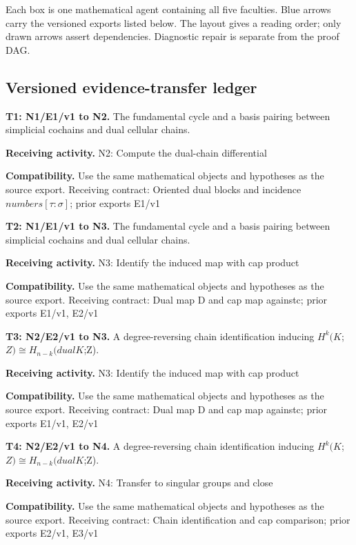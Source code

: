\documentclass[preprint,12pt,aps,pra,showkeys,amsmath,amssymb,superscriptaddress,floatfix]{revtex4-2}
\theoremstyle{definition}
\theoremstyle{remark}
\newcommand{\field}[2]{\par\smallskip\noindent\textbf{#1.} #2\par}
\begin{document}
Each box is one mathematical agent containing all five faculties. Blue
arrows carry the versioned exports listed below. The layout gives a
reading order; only drawn arrows assert dependencies. Diagnostic repair
is separate from the proof DAG.

\clearpage\subsection{Versioned evidence-transfer ledger}

\begingroup\small\linespread{1.05}\selectfont

\field{T1: N1/E1/v1 to N2}{The fundamental cycle and a basis pairing between simplicial cochains
and dual cellular chains.}

\field{Receiving activity}{N2: Compute the dual-chain differential}

\field{Compatibility}{Use the same mathematical objects and hypotheses as the source export.
Receiving contract: Oriented dual blocks and incidence
\(numbers[\tau :\sigma ]\); prior exports E1/v1}

\field{T2: N1/E1/v1 to N3}{The fundamental cycle and a basis pairing between simplicial cochains
and dual cellular chains.}

\field{Receiving activity}{N3: Identify the induced map with cap product}

\field{Compatibility}{Use the same mathematical objects and hypotheses as the source export.
Receiving contract: Dual map D and cap map againstc; prior exports
E1/v1, E2/v1}

\field{T3: N2/E2/v1 to N3}{A degree-reversing chain identification inducing
\(H^k(K\);\(Z)\cong H_{n-k}(dualK\);Z).}

\field{Receiving activity}{N3: Identify the induced map with cap product}

\field{Compatibility}{Use the same mathematical objects and hypotheses as the source export.
Receiving contract: Dual map D and cap map againstc; prior exports
E1/v1, E2/v1}

\field{T4: N2/E2/v1 to N4}{A degree-reversing chain identification inducing
\(H^k(K\);\(Z)\cong H_{n-k}(dualK\);Z).}

\field{Receiving activity}{N4: Transfer to singular groups and close}

\field{Compatibility}{Use the same mathematical objects and hypotheses as the source export.
Receiving contract: Chain identification and cap comparison; prior
exports E2/v1, E3/v1}
\end{document}
